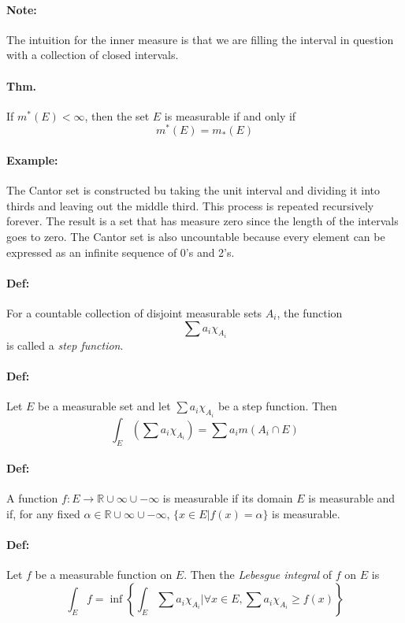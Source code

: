 \documentclass[10pt,a4paper]{article}
\begin{document}
\paragraph{Note:} The intuition for the inner measure is that we are filling the interval in question with a collection of closed intervals.

\paragraph{Thm.} If $m^*(E) < \infty$, then the set $E$ is measurable if and only if
$$ m^*(E) = m_*(E)$$

\paragraph{Example:} The Cantor set is constructed bu taking the unit interval and dividing it into thirds and leaving out the middle third. This process is repeated recursively forever. The result is a set that has measure zero since the length of the intervals goes to zero. The Cantor set is also uncountable because every element can be expressed as an infinite sequence of 0's and 2's.

\paragraph{Def:} For a countable collection of disjoint measurable sets $A_i$, the function
$$ \sum a_i \chi_{A_i}$$
is called a \textit{step function}.

\paragraph{Def:} Let $E$ be a measurable set and let $\sum  a_i \chi_{A_i}$ be a step function. Then
$$ \int_E \left( \sum  a_i \chi_{A_i} \right)= \sum a_i m(A_i \cap E)$$

\paragraph{Def:} A function $f: E \to \mathbb{R} \cup \infty \cup -\infty$ is measurable if its domain $E$ is measurable and if, for any fixed $\alpha \in \mathbb{R} \cup \infty \cup -\infty$, $\{x \in E | f(x) = \alpha \}$ is measurable.

\paragraph{Def:} Let $f$ be a measurable function on $E$. Then the \textit{Lebesgue integral} of $f$ on $E$ is
$$ \int_E f = \inf \left\{  \int_E \sum a_i\chi_{A_i} | \forall x \in E, \sum a_i \chi_{A_i} \geq f(x) \right\}$$
\end{document}
